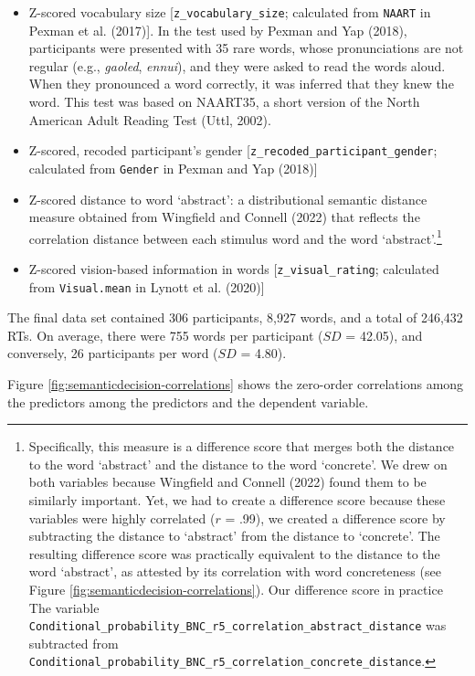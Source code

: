 \documentclass[
  12pt,
  man,floatsintext]{apa7}
\begin{document}
\begin{itemize}
\item
  Z-scored vocabulary size {[}\texttt{z\_vocabulary\_size}; calculated from \texttt{NAART} in Pexman et al. (2017){]}. In the test used by Pexman and Yap (2018), participants were presented with 35 rare words, whose pronunciations are not regular (e.g., \emph{gaoled}, \emph{ennui}), and they were asked to read the words aloud. When they pronounced a word correctly, it was inferred that they knew the word. This test was based on NAART35, a short version of the North American Adult Reading Test (Uttl, 2002).
\item
  Z-scored, recoded participant's gender {[}\texttt{z\_recoded\_participant\_gender}; calculated from \texttt{Gender} in Pexman and Yap (2018){]}
\item
  Z-scored distance to word `abstract': a distributional semantic distance measure obtained from Wingfield and Connell (2022) that reflects the correlation distance between each stimulus word and the word `abstract'.\footnote{Specifically, this measure is a difference score that merges both the distance to the word `abstract' and the distance to the word `concrete'. We drew on both variables because Wingfield and Connell (2022) found them to be similarly important. Yet, we had to create a difference score because these variables were highly correlated (\(r\) = .99), we created a difference score by subtracting the distance to `abstract' from the distance to `concrete'. The resulting difference score was practically equivalent to the distance to the word `abstract', as attested by its correlation with word concreteness (see Figure \ref{fig:semanticdecision-correlations}). Our difference score in practice The variable \texttt{Conditional\_probability\_BNC\_r5\_correlation\_abstract\_distance} was subtracted from \texttt{Conditional\_probability\_BNC\_r5\_correlation\_concrete\_distance}.}
\item
  Z-scored vision-based information in words {[}\texttt{z\_visual\_rating}; calculated from \texttt{Visual.mean} in Lynott et al. (2020){]}
\end{itemize}

The final data set contained 306 participants, 8,927 words, and a total of 246,432 RTs. On average, there were 755 words per participant (\(SD\) = 42.05), and conversely, 26 participants per word (\(SD\) = 4.80).

Figure \ref{fig:semanticdecision-correlations} shows the zero-order correlations among the predictors among the predictors and the dependent variable.
\end{document}

